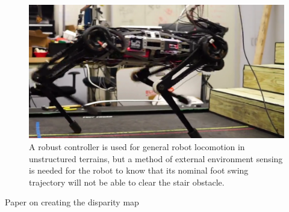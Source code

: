 \begin{figure}[t]
\centering
\includegraphics[width=\columnwidth]{Figures/RobotIntro.pdf}
\caption{A robust controller is used for general robot locomotion in unstructured terrains, but a method of external environment sensing is needed for the robot to know that its nominal foot swing trajectory will not be able to clear the stair obstacle.}
\label{fig:RI}
\end{figure}

Paper on creating the disparity map \cite{1467526} 